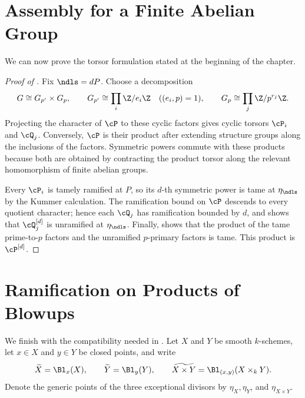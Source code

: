 \section{Assembly for a Finite Abelian Group}

We can now prove the torsor formulation stated at the beginning of the
chapter.

\begin{proof}[Proof of ]
Fix $\ndls=dP$. Choose a decomposition
\[
   G\cong G_{p'}\times G_p,
   \qquad
   G_{p'}\cong\prod_i\Z/e_i\Z\quad((e_i,p)=1),
   \qquad
   G_p\cong\prod_j\Z/p^{r_j}\Z.
\]
Projecting the character of $\cP$ to these cyclic factors gives cyclic torsors
$\cP_i$ and $\cQ_j$. Conversely, $\cP$ is their product after extending
structure groups along the inclusions of the factors. Symmetric powers commute
with these products because both are obtained by contracting the product
torsor along the relevant homomorphism of finite abelian groups.

Every $\cP_i$ is tamely ramified at $P$, so its $d$-th symmetric power is tame
at $\eta_\ndls$ by the Kummer calculation. The ramification bound on $\cP$
descends to every quotient character; hence each $\cQ_j$ has ramification
bounded by $d$, and 
shows that $\cQ_j^{[d]}$ is unramified at $\eta_\ndls$. Finally,
 shows that the product
of the tame prime-to-$p$ factors and the unramified $p$-primary factors is
tame. This product is $\cP^{[d]}$.
\end{proof}

\section{Ramification on Products of Blowups}
\label{subsection:ram_prod_analysis}

We finish with the compatibility needed in
. Let $X$ and $Y$ be smooth $k$-schemes, let $x\in X$ and
$y\in Y$ be closed points, and write
\[
 \widetilde X=\Bl_x(X),\qquad
 \widetilde Y=\Bl_y(Y),\qquad
 \widetilde{X\times Y}=\Bl_{(x,y)}(X\times_kY).
\]
Denote the generic points of the three exceptional divisors by
$\eta_X,\eta_Y$, and $\eta_{X\times Y}$.

